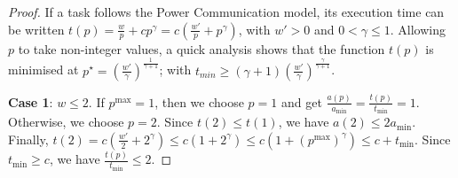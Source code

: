 \documentclass{article}
\begin{document}
\begin{proof}
If a task follows the Power Communication model, its execution time can be written
$t(p) = \frac{w}{p} + c p^\gamma
       = c \left( \frac{w'}{p} + p^\gamma \right)$,
with $w'>0$ and $0<\gamma \le 1$.  Allowing $p$ to take non-integer values, a quick analysis shows that
the function $t(p)$ is minimised at
$p^{\star} = \left( \frac{w'}{\gamma} \right)^{\frac{1}{\gamma+1}}$; with
 $t_{min} \geq \left( \gamma+1\right)\left( \frac{w'}{\gamma} \right)^{\frac{\gamma}{\gamma+1}}$.

\textbf{Case 1}: $w \leq 2$.  
If $p^{\max}=1$, then we choose $p=1$ and get $\frac{a(p)}{a_{\min}} = \frac{t(p)}{t_{\min}} = 1$. Otherwise, we choose $p=2$. Since $t(2) \leq t(1)$, we have $a(2) \leq 2a_{\min}$. Finally, $t(2) = c\left(\frac{w'}{2} + 2^\gamma \right) \leq c(1 + 2^\gamma) \leq c\left(1 + ({p^{\max}})^\gamma \right) \leq c +t_{\min}$. Since $t_{\min} \geq c$, we have $\frac{t(p)}{t_{\min}} \leq 2$.


\end{proof}
\end{document}
